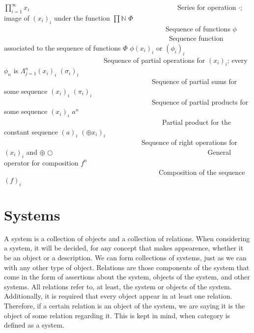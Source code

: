 \documentclass [12pt]{book}
\begin{document}
$\prod\limits_{i=1}^\infty x_i$~~~~~~~~~~~~~~~~~~~~~~~~~~~~~~~~~~~~~~~~~~~Series for operation $\cdot$; image of $(x_i)_i$ under the function $\prod\mathbb N$\newline
$\Phi$~~~~~~~~~~~~~~~~~~~~~~~~~~~~~~~~~~~~~~~~~~~~~~~Sequence of functions\newline
$\phi$~~~~~~~~~~~~~~~~~~~~~~~~~~~~~~~~~~~~~~~~~~~~~~~~Sequence function associated to the sequence of functions $\Phi$\newline
$\phi(x_i)_i$ or $(\phi_i)_i$~~~~~~~~~~~~~~~~~~~~~~~~~~~~~Sequence of partial operations for $(x_i)_i$; every $\phi_n$ is $\Lambda_{j=1}^n(x_i)_i$\newline
$(\sigma_i)_i$~~~~~~~~~~~~~~~~~~~~~~~~~~~~~~~~~~~~~~~~~~~Sequence of partial sums for some sequence $(x_i)_i$\newline
$(\pi_i)_i$~~~~~~~~~~~~~~~~~~~~~~~~~~~~~~~~~~~~~~~~~~~Sequence of partial products for some sequence $(x_i)_i$\newline
$a^n$~~~~~~~~~~~~~~~~~~~~~~~~~~~~~~~~~~~~~~~~~~~~~~Partial product for the constant sequence $(a)_i$\newline
$(\oplus x_i)_i$~~~~~~~~~~~~~~~~~~~~~~~~~~~~~~~~~~~~~~~~Sequence of right operations for $(x_i)_i$ and $\oplus$\newline
$\bigcirc$~~~~~~~~~~~~~~~~~~~~~~~~~~~~~~~~~~~~~~~~~~~~~General operator for composition\newline
$f^n$~~~~~~~~~~~~~~~~~~~~~~~~~~~~~~~~~~~~~~~~~~~~~Composition of the sequence $(f)_i$\newline

\chapter{Systems}

A system is a collection of objects and a collection of relations. When considering a system, it will be decided, for any concept that makes appearence, whether it be an object or a description. We can form collections of systems, just as we can with any other type of object. Relations are those components of the system that come in the form of assertions about the system, objects of the system, and other systems. All relations refer to, at least, the system or objects of the system. Additionally, it is required that every object appear in at least one relation. Therefore, if a certain relation is an object of the system, we are saying it is the object of some relation regarding it. This is kept in mind, when category is defined as a system.
\end{document}
